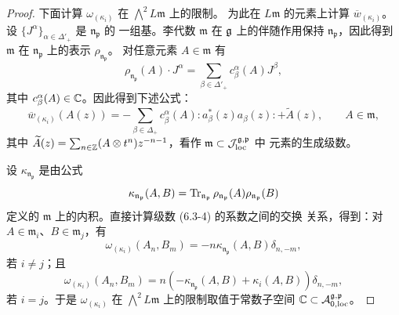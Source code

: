 \begin{proof}
    下面计算 $\omega_{(\kappa_i)}$ 在 $\bigwedge^2L\mathfrak m$ 上的限制。
    为此在 $L\mathfrak m$ 的元素上计算 $\overline w_{(\kappa_i)}$。设
    $\{J^\alpha\}_{\alpha\in\Delta'_+}$ 是 $\mathfrak n_{\mathfrak p}$ 的
    一组基。李代数 $\mathfrak m$ 在 $\mathfrak{g}$ 上的伴随作用保持
    $\mathfrak n_{\mathfrak p}$，因此得到 $\mathfrak m$ 在
    $\mathfrak n_{\mathfrak p}$ 上的表示 $\rho_{\mathfrak n_{\mathfrak p}}$。
    对任意元素 $A\in\mathfrak m$ 有
    \[
        \rho_{\mathfrak n_{\mathfrak p}}(A)\cdot J^\alpha
        =\sum_{\beta\in\Delta'_+}c^\alpha_\beta(A)J^\beta,
    \]
    其中 $c^\alpha_\beta(A)\in\mathbb{C}$。因此得到下述公式：
    \begin{equation}
        \overline w_{(\kappa_i)}(A(z))
        =-\sum_{\beta\in\Delta_+}c^\alpha_\beta(A)
        :\!a^*_\beta(z)a_\beta(z)\!:+\widetilde A(z),
        \qquad A\in\mathfrak m,
        \tag{6.3-4}
    \end{equation}
    其中 $\widetilde A(z)=\sum_{n\in\mathbb{Z}}(A\otimes t^n)z^{-n-1}$，看作
    $\mathfrak m\subset\mathcal{J}^{\mathfrak g,\mathfrak p}_{\mathrm{loc}}$ 中
    元素的生成级数。

    设 $\kappa_{\mathfrak n_{\mathfrak p}}$ 是由公式
    \[
        \kappa_{\mathfrak n_{\mathfrak p}}(A,B)
        =\operatorname{Tr}_{\mathfrak n_{\mathfrak p}}\rho_{\mathfrak n_{\mathfrak p}}(A)
        \rho_{\mathfrak n_{\mathfrak p}}(B)
    \]
    定义的 $\mathfrak m$ 上的内积。直接计算级数 (6.3-4) 的系数之间的交换
    关系，得到：对 $A\in\mathfrak m_i$、$B\in\mathfrak m_j$，有
    \begin{equation}
        \omega_{(\kappa_i)}(A_n,B_m)
        =-n\kappa_{\mathfrak n_{\mathfrak p}}(A,B)\delta_{n,-m},
        \tag{6.3-5}
    \end{equation}
    若 $i\ne j$；且
    \begin{equation}
        \omega_{(\kappa_i)}(A_n,B_m)
        =n\left(-\kappa_{\mathfrak n_{\mathfrak p}}(A,B)
        +\kappa_i(A,B)\right)\delta_{n,-m},
        \tag{6.3-6}
    \end{equation}
    若 $i=j$。于是 $\omega_{(\kappa_i)}$ 在
    $\bigwedge^2L\mathfrak m$ 上的限制取值于常数子空间
    $\mathbb{C}\subset\mathcal{A}^{\mathfrak g,\mathfrak p}_{0,\mathrm{loc}}$。


\end{proof}
